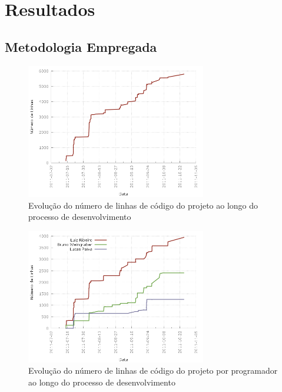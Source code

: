 \chapter{Resultados}
\label{chap:result}

\section{Metodologia Empregada}


\begin{figure}[!htb]
	\centering
	\includegraphics[width=0.7\textwidth]{./plots/lines_of_code.png}
	\caption[Evolução do número de linhas de código do projeto]{Evolução do número de linhas de código do projeto ao longo do processo de desenvolvimento}
	\label{fig:linesofcode}
\end{figure}

\begin{figure}[!htb]
	\centering
	\includegraphics[width=0.7\textwidth]{./plots/lines_of_code_by_author.png}
	\caption[Evolução do número de linhas de código por programador]{Evolução do número de linhas de código do projeto por programador ao longo do processo de desenvolvimento}
	\label{fig:linesofcodebyauthor}
\end{figure}

